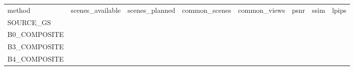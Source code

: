 \begin{tabular}{llllllll}
method & scenes\_available & scenes\_planned & common\_scenes & common\_views & psnr & ssim & lpips \\
SOURCE\_GS &  &  &  &  &  &  &  \\
B0\_COMPOSITE &  &  &  &  &  &  &  \\
B3\_COMPOSITE &  &  &  &  &  &  &  \\
B4\_COMPOSITE &  &  &  &  &  &  &  \\
\end{tabular}
